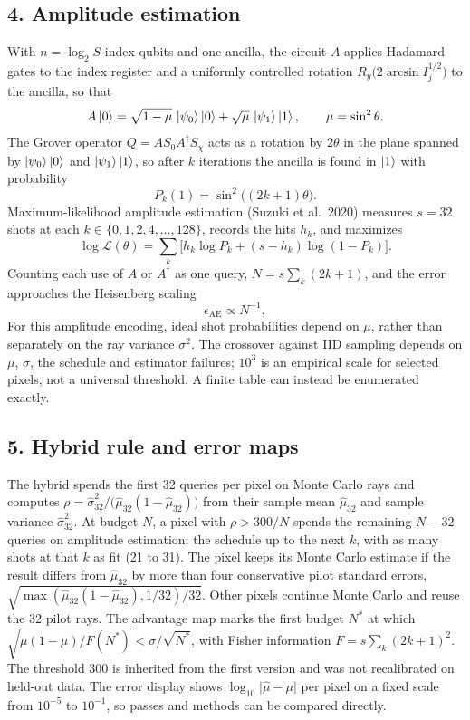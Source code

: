 \documentclass[11pt,twocolumn]{article}
\begin{document}
\subsection*{4. Amplitude estimation}
With $n = \log_2 S$ index qubits and one ancilla, the circuit $A$ applies Hadamard gates to the
index register and a uniformly controlled rotation $R_y\bigl(2\arcsin I_j^{1/2}\bigr)$ to the
ancilla, so that
\begin{equation}
  A\ket{0} = \sqrt{1-\mu}\,\ket{\psi_0}\ket{0} + \sqrt{\mu}\,\ket{\psi_1}\ket{1},
  \qquad \mu = \sin^2\theta.
\end{equation}
The Grover operator $Q = A S_0 A^\dagger S_\chi$ acts as a rotation by $2\theta$ in the plane
spanned by $\ket{\psi_0}\ket{0}$ and $\ket{\psi_1}\ket{1}$, so after $k$ iterations the ancilla is
found in $\ket{1}$ with probability
\begin{equation}
  P_k(1) = \sin^2\!\bigl((2k+1)\theta\bigr).
\end{equation}
Maximum-likelihood amplitude estimation (Suzuki et al.\ 2020) measures $s = 32$ shots at each
$k \in \{0, 1, 2, 4, \dots, 128\}$, records the hits $h_k$, and maximizes
\begin{equation}
  \log\mathcal{L}(\theta) = \sum_k \bigl[h_k \log P_k + (s - h_k)\log(1 - P_k)\bigr].
\end{equation}
Counting each use of $A$ or $A^\dagger$ as one query, $N = s\sum_k (2k+1)$, and the error
approaches the Heisenberg scaling
\begin{equation}
  \epsilon_{\mathrm{AE}} \propto N^{-1},
\end{equation}
For this amplitude encoding, ideal shot probabilities depend on $\mu$, rather than separately
on the ray variance $\sigma^2$. The crossover against IID sampling depends on $\mu$, $\sigma$,
the schedule and estimator failures; $10^3$ is an empirical scale for selected pixels,
not a universal threshold. A finite table can instead be enumerated exactly.

\subsection*{5. Hybrid rule and error maps}
The hybrid spends the first 32 queries per pixel on Monte Carlo rays and computes
$\rho = \hat\sigma_{32}^2/\bigl(\hat\mu_{32}(1 - \hat\mu_{32})\bigr)$ from their sample mean
$\hat\mu_{32}$ and sample variance $\hat\sigma_{32}^2$. At budget $N$, a pixel with
$\rho > 300/N$ spends the remaining $N - 32$ queries on amplitude estimation: the schedule up to the
next $k$, with as many shots at that $k$ as fit (21 to 31). The pixel keeps its Monte Carlo estimate
if the result differs from $\hat\mu_{32}$ by more than four conservative pilot standard errors,
$\sqrt{\max(\hat\mu_{32}(1-\hat\mu_{32}), 1/32)/32}$. Other pixels continue Monte Carlo and reuse the 32 pilot rays. The advantage map marks the
first budget $N^*$ at which $\sqrt{\mu(1-\mu)/F(N^*)} < \sigma/\sqrt{N^*}$, with Fisher information
$F = s\sum_k (2k+1)^2$. The threshold 300 is inherited from the first version and was not
recalibrated on held-out data. The error display shows
$\log_{10}\lvert\hat\mu - \mu\rvert$ per pixel on a fixed scale from $10^{-5}$ to $10^{-1}$, so
passes and methods can be compared directly.
\end{document}
